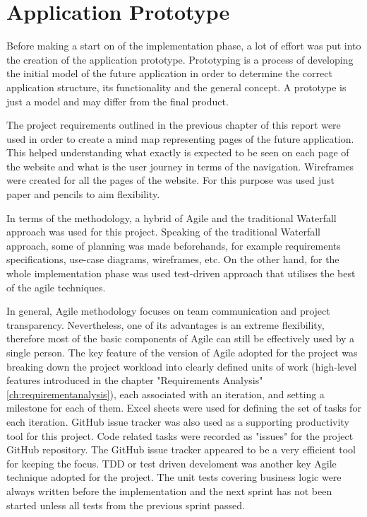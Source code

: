 \chapter{Application Prototype}
\label{ch:Prototype}
Before making a start on of the implementation phase, a lot of effort was put into the creation of the application prototype. Prototyping is a process of developing the initial model of the future application in order to determine the correct application structure, its functionality and the general concept. A prototype is just a model and may differ from the final product.

The project requirements outlined in the previous chapter of this report were used in order to create a mind map representing pages of the future application. This helped understanding what exactly is expected to be seen on each page of the website and what is the user journey in terms of the navigation. Wireframes were created for all the pages of the website. For this purpose was used just paper and pencils to aim flexibility.

In terms of the methodology, a hybrid of Agile and the traditional Waterfall approach was used for this project. Speaking of the traditional Waterfall approach, some of planning was made beforehands, for example requirements specifications, use-case diagrams, wireframes, etc. On the other hand, for the whole implementation phase was used test-driven approach that utilises the best of the agile techniques.

In general, Agile methodology focuses on team communication and project transparency. Nevertheless, one of its advantages is an extreme flexibility, therefore most of the basic components of Agile can still be effectively used by a single person. The key feature of the version of Agile adopted for the project was breaking down the project workload into clearly defined units of work (high-level features introduced in the chapter "Requirements Analysis" \ref{ch:requirementanalysis}), each associated with an iteration, and setting a milestone for each of them. Excel sheets were used for defining the set of tasks for each iteration. GitHub issue tracker was also used as a supporting productivity tool for this project. Code related tasks were recorded as "issues" for the project GitHub repository. The GitHub issue tracker appeared to be a very efficient tool for keeping the focus. TDD or test driven develoment was another key Agile technique adopted for the project. The unit tests covering business logic were always written before the implementation and the next sprint has not been started unless all tests from the previous sprint passed. 


